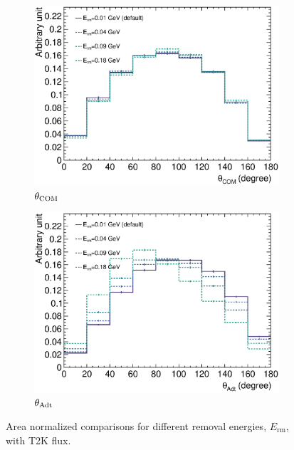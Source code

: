      \begin{figure}[ht!]
     \centering
     \begin{subfigure}[ht!]{\dbfigwid\textwidth}
          \centering
          \includegraphics[width=\textwidth]{figures/COM/anorm-nuc_da_tan.eps}
          \caption{$\theta_{\textrm{COM}}$}
          \label{subfig:ermc-comp-com}
     \end{subfigure}
     \begin{subfigure}[ht!]{\dbfigwid\textwidth}
          \centering
          \includegraphics[width=\textwidth]{figures/COM/anorm-nuc_adt.eps}
          \caption{$\theta_{\textrm{Adt}}$}
          \label{subfig:ermc-comp-adt}
     \end{subfigure}
          
     \caption{Area normalized comparisons for different removal energies, $E_{\textrm{rm}}$, with T2K flux.}
     \label{fig:ermc-comp}
     \end{figure}

